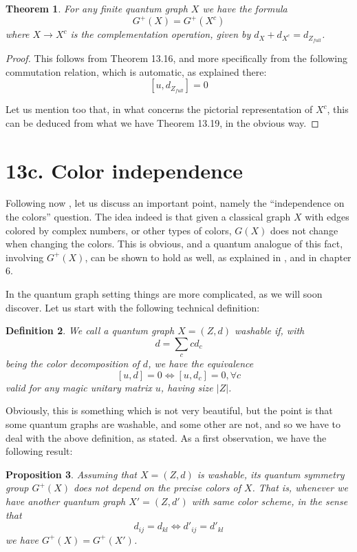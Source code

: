 \documentclass[12pt]{amsbook}
\newtheorem{theorem}{Theorem}[chapter]
\newtheorem{definition}[theorem]{Definition}
\newtheorem{proposition}[theorem]{Proposition}
\begin{document}
\begin{theorem}
For any finite quantum graph $X$ we have the formula
$$G^+(X)=G^+(X^c)$$
where $X\to X^c$ is the complementation operation, given by $d_X+d_{X^c}=d_{Z_{full}}$.
\end{theorem}

\begin{proof}
This follows from Theorem 13.16, and more specifically from the following commutation relation, which is automatic, as explained there:
$$[u,d_{Z_{full}}]=0$$

Let us mention too that, in what concerns the pictorial representation of $X^c$, this can be deduced from what we have Theorem 13.19, in the obvious way.
\end{proof}

\section*{13c. Color independence} 

Following now \cite{ba2}, let us discuss an important point, namely the ``independence on the colors'' question. The idea indeed is that given a classical graph $X$ with edges colored by complex numbers, or other types of colors, $G(X)$ does not change when changing the colors. This is obvious, and a quantum analogue of this fact, involving $G^+(X)$, can be shown to hold as well, as explained in \cite{ba2}, and in chapter 6. 

\bigskip

In the quantum graph setting things are more complicated, as we will soon discover. Let us start with the following technical definition:

\begin{definition}
We call a quantum graph $X=(Z,d)$ washable if, with
$$d=\sum_ccd_c$$
being the color decomposition of $d$, we have the equivalence
$$[u,d]=0\iff[u,d_c]=0,\forall c$$
valid for any magic unitary matrix $u$, having size $|Z|$.
\end{definition}

Obviously, this is something which is not very beautiful, but the point is that some quantum graphs are washable, and some other are not, and so we have to deal with the above definition, as stated. As a first observation, we have the following result:

\begin{proposition}
Assuming that $X=(Z,d)$ is washable, its quantum symmetry group $G^+(X)$ does not depend on the precise colors of $X$. That is, whenever we have another quantum graph $X'=(Z,d')$ with same color scheme, in the sense that 
$$d_{ij}=d_{kl}\iff d'_{ij}=d'_{kl}$$
we have $G^+(X)=G^+(X')$.
\end{proposition}
\end{document}
